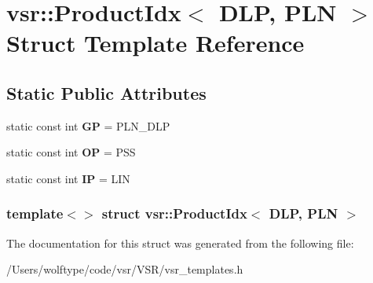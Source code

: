 \hypertarget{structvsr_1_1_product_idx_3_01_d_l_p_00_01_p_l_n_01_4}{\section{vsr\-:\-:Product\-Idx$<$ D\-L\-P, P\-L\-N $>$ Struct Template Reference}
\label{structvsr_1_1_product_idx_3_01_d_l_p_00_01_p_l_n_01_4}
}
\subsection*{Static Public Attributes}
\begin{DoxyCompactItemize}
\item 
\hypertarget{structvsr_1_1_product_idx_3_01_d_l_p_00_01_p_l_n_01_4_ab445ebfaafef1b7297d81af80af4dc32}{static const int {\bfseries G\-P} = P\-L\-N\-\_\-\-D\-L\-P}\label{structvsr_1_1_product_idx_3_01_d_l_p_00_01_p_l_n_01_4_ab445ebfaafef1b7297d81af80af4dc32}

\item 
\hypertarget{structvsr_1_1_product_idx_3_01_d_l_p_00_01_p_l_n_01_4_a73a8216a2b09bea440b5ec53cbab5adb}{static const int {\bfseries O\-P} = P\-S\-S}\label{structvsr_1_1_product_idx_3_01_d_l_p_00_01_p_l_n_01_4_a73a8216a2b09bea440b5ec53cbab5adb}

\item 
\hypertarget{structvsr_1_1_product_idx_3_01_d_l_p_00_01_p_l_n_01_4_aa82b15e23a255cdec53375dfd7137e70}{static const int {\bfseries I\-P} = L\-I\-N}\label{structvsr_1_1_product_idx_3_01_d_l_p_00_01_p_l_n_01_4_aa82b15e23a255cdec53375dfd7137e70}

\end{DoxyCompactItemize}
\subsubsection*{template$<$$>$ struct vsr\-::\-Product\-Idx$<$ D\-L\-P, P\-L\-N $>$}



The documentation for this struct was generated from the following file\-:\begin{DoxyCompactItemize}
\item 
/\-Users/wolftype/code/vsr/\-V\-S\-R/vsr\-\_\-templates.\-h\end{DoxyCompactItemize}
